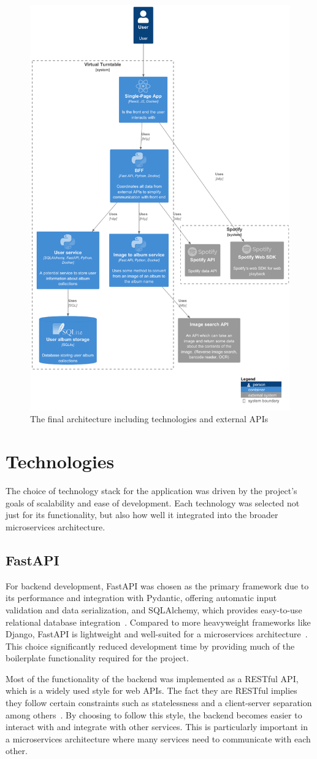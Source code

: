 \begin{figure} [H]
    \centering
    \includegraphics[width=0.5\linewidth]{figures/final_arch.png}
    \caption{The final architecture including technologies and external APIs}
    \label{fig:final-arch}
\end{figure}


\section{Technologies}
The choice of technology stack for the application was driven by the project's goals of scalability and ease of development. Each technology was selected not just for its functionality, but also how well it integrated into the broader microservices architecture.

\subsection{FastAPI}
For backend development, FastAPI was chosen as the primary framework due to its performance and integration with Pydantic, offering automatic input validation and data serialization, and SQLAlchemy, which provides easy-to-use relational database integration~\cite{FastAPI}. Compared to more heavyweight frameworks like Django, FastAPI is lightweight and well-suited for a microservices architecture~\cite{9717259}. This choice significantly reduced development time by providing much of the boilerplate functionality required for the project.

Most of the functionality of the backend was implemented as a RESTful API, which is a widely used style for web APIs. The fact they are RESTful implies they follow certain constraints such as statelessness and a client-server separation among others~\cite{Fielding}. By choosing to follow this style, the backend becomes easier to interact with and integrate with other services. This is particularly important in a microservices architecture where many services need to communicate with each other.

